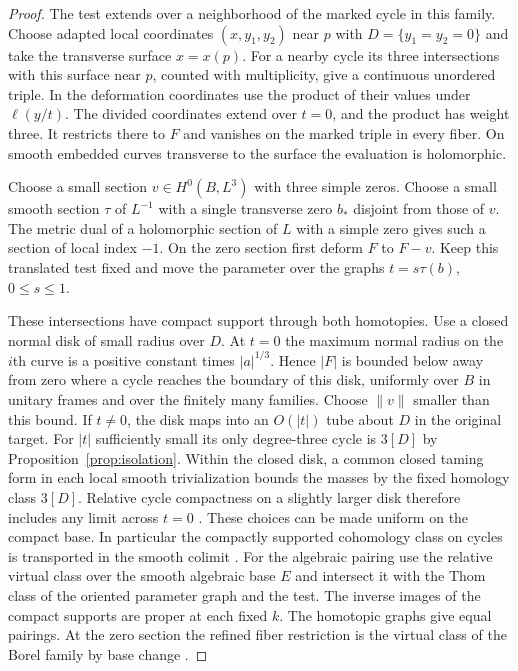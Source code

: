\begin{proof}
The test extends over a neighborhood of the marked cycle in this
family. Choose adapted local coordinates $(x,y_1,y_2)$ near $p$ with
$D=\{y_1=y_2=0\}$ and take the transverse surface $x=x(p)$.
For a nearby cycle its three intersections with this surface near $p$,
counted with multiplicity, give a continuous unordered triple. In
the deformation coordinates use the product of their values under
$\ell(y/t)$. The divided coordinates extend over $t=0$, and the
product has weight three. It restricts there to $F$ and vanishes on
the marked triple in every fiber. On smooth embedded curves transverse
to the surface the evaluation is holomorphic.

Choose a small section $v\in H^0(B,L^3)$ with three simple zeros.
Choose a small smooth section $\tau$ of $L^{-1}$ with a single
transverse zero $b_*$ disjoint from those of $v$. The metric dual of
a holomorphic section of $L$ with a simple zero gives such a section
of local index $-1$. On the zero section first deform $F$ to $F-v$.
Keep this translated test fixed and move the parameter over the
graphs $t=s\tau(b)$, $0\le s\le1$.

These intersections have compact support through both homotopies.
Use a closed normal disk of small radius over $D$. At $t=0$ the
maximum normal radius on the $i$th curve is a positive constant
times $|a|^{1/3}$. Hence $|F|$ is bounded below away from zero
where a cycle reaches the boundary of this disk, uniformly over
$B$ in unitary frames and over the finitely many families. Choose
$\|v\|$ smaller than this bound. If $t\ne0$, the disk maps into
an $O(|t|)$ tube about $D$ in the original target. For $|t|$
sufficiently small its only degree-three cycle is $3[D]$ by
Proposition~\ref{prop:isolation}. Within the closed disk, a common
closed taming form in each local smooth trivialization bounds the
masses by the fixed homology class $3[D]$. Relative cycle compactness
on a slightly larger disk therefore includes any limit across
$t=0$ \cite[Theorem~2.11]{DIW}. These choices can be made uniform
on the compact base. In particular the compactly supported
cohomology class on cycles is transported in the smooth colimit
\cite[\S2]{WueProduct}. For the algebraic pairing use the relative
virtual class over the smooth algebraic base $E$ and intersect it
with the Thom class of the oriented parameter graph and the test.
The inverse images of the compact supports are proper at each fixed
$k$. The homotopic graphs give equal pairings. At the zero section
the refined fiber restriction is the virtual class of the Borel
family by base change \cite[Proposition~7.2]{BF}.


\end{proof}
